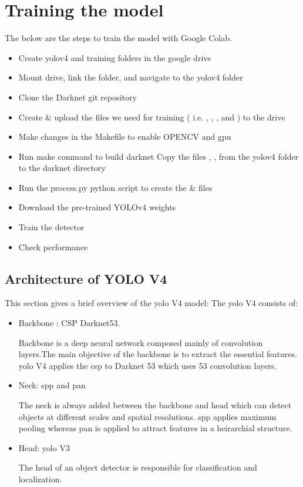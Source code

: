\section{Training the model}

The below are the steps to train the model with Google Colab.
\begin{itemize}
	\item Create yolov4 and training folders in the google drive
	\item Mount drive, link the folder, and navigate to the yolov4 folder
	\item Clone the Darknet git repository \cite{Bochkovskiy:2020}
	\item Create \& upload the files we need for training ( i.e.  , , ,  and  ) to the drive
	\item Make changes in the Makefile to enable OPENCV and \ac{gpu}
	\item Run make command to build darknet
	Copy the files ,   ,  from the yolov4 folder to the darknet directory
	\item Run the process.py python script to create the  \&  files
	\item Download the pre-trained YOLOv4 weights
	\item Train the detector
	\item Check performance
\end{itemize}

\subsection{Architecture of YOLO V4} 
This section gives a brief overview of the \ac{yolo} V4 model: 
The \ac{yolo} V4 \cite{Bochkovskiy:2020} consists of:
\begin{itemize}
	\item Backbone : CSP Darknet53.

	Backbone is a deep neural network composed mainly of convolution layers.The main objective of the backbone is to extract the essential features. \ac{yolo} V4 applies the \ac{csp} to Darknet 53 which uses 53 convolution layers.
	
	\item Neck: \ac{spp} and \ac{pan}
	
	The neck is always added between the backbone and head which can detect objects at different scales and spatial resolutions. \ac{spp} applies maximum pooling whereas \ac{pan} is applied to attract features in a heirarchial structure.
	
	\item Head: \ac{yolo} V3
	
	The head of an object detector is responsible for classification and localization.
\end{itemize}

